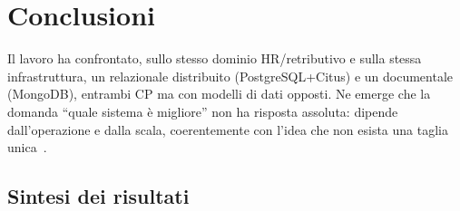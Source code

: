 \chapter{Conclusioni}
\label{ch:conclusioni}

Il lavoro ha confrontato, sullo stesso dominio HR/retributivo e sulla stessa infrastruttura, un relazionale
distribuito (PostgreSQL+Citus) e un documentale (MongoDB), entrambi CP ma con modelli di dati opposti. Ne
emerge che la domanda ``quale sistema è migliore'' non ha risposta assoluta: dipende dall'operazione e dalla
scala, coerentemente con l'idea che non esista una taglia unica~\cite{stonebraker2005onesize}.

\section{Sintesi dei risultati}
\label{sec:sintesi}

